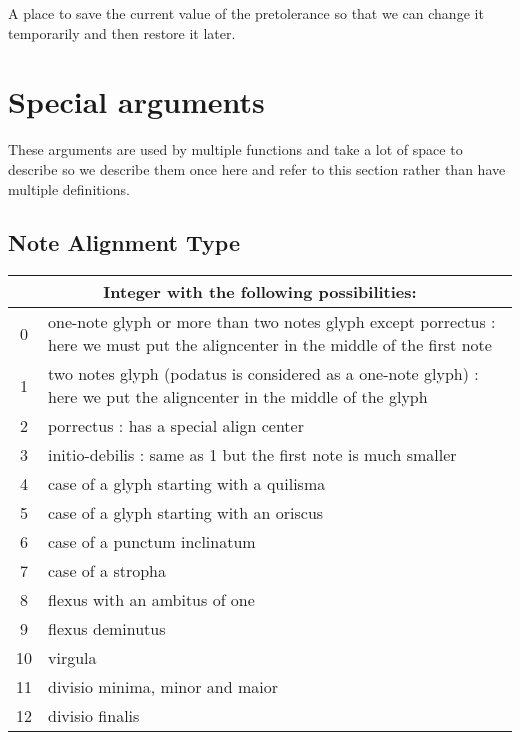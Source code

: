 A place to save the current value of the pretolerance so that we can change it temporarily and then restore it later.



\section{Special arguments}

These arguments are used by multiple functions and take a lot of space
to describe so we describe them once here and refer to this section
rather than have multiple definitions.

\subsection{Note Alignment Type}\label{notesalign}
\begin{tabular}{cp{}}
  \multicolumn{2}{c}{Integer with the following possibilities:} \\
  \hline
  0 & one-note glyph or more than two notes glyph except porrectus : here we must put the aligncenter in the middle of the first note\\
  1 & two notes glyph (podatus is considered as a one-note glyph) : here we put the aligncenter in the middle of the glyph\\
  2 & porrectus : has a special align center\\
  3 & initio-debilis : same as 1 but the first note is much smaller\\
  4 & case of a glyph starting with a quilisma\\
  5 & case of a glyph starting with an oriscus\\
  6 & case of a punctum inclinatum\\
  7 & case of a stropha\\
  8 & flexus with an ambitus of one\\
  9 & flexus deminutus\\
  10 & virgula\\
  11 & divisio minima, minor and maior\\
  12 & divisio finalis
 \end{tabular}

